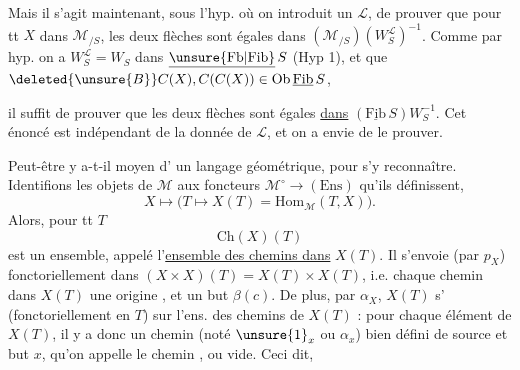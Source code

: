 Mais il s'agit maintenant, sous l'hyp. où on introduit un $\mathcal L$, de prouver que pour tt $X$ dans $\mathcal M_{/S}$, les deux flèches
sont égales dans $(\mathcal M_{/S})(W_S^{\mathcal L})^{-1}$. Comme par hyp. on a $W_S^{\mathcal L}=W_S$ dans $\underline{\unsure{\mathrm{Fb}|\mathrm{Fib}}}\,S$ (Hyp 1), et que $\deleted{\unsure{B}}C(X),C(C(X))\in\mathrm{Ob}\,\underline{\mathrm{Fib}}\,S$,

il suffit de prouver que les deux flèches sont égales \uline{dans} $(\underline{\mathrm{Fib}}\,S)W_S^{-1}$. Cet énoncé est indépendant de la donnée de $\mathcal L$, et on a envie de le prouver.

Peut-être y a-t-il moyen d' un langage géométrique, pour s'y reconnaître.  Identifions les objets  de $\mathcal M$ aux foncteurs $\mathcal M^\circ\longrightarrow(\mathrm{Ens})$ qu'ils définissent,
\[
X\longmapsto\bigl(T\longmapsto X(T)=\mathrm{Hom}_{\mathcal M}(T,X)\bigr)\text{.}
\]
Alors, pour tt $T$
\[
\mathrm{Ch}(X)(T)
\]
est un ensemble, appelé l'\uline{ensemble des chemins dans} $X(T)$. Il s'envoie (par $p_X$) fonctoriellement  dans $(X\times X)(T)=X(T)\times X(T)$, i.e. chaque chemin  dans $X(T)$  une origine , et un but $\beta(c)$. De plus, par $\alpha_X$, $X(T)$ s' (fonctoriellement en $T$) sur l'ens. des chemins de $X(T)$ : pour chaque élément  de $X(T)$, il y a donc un chemin (noté $\unsure{1}_x$ ou $\alpha_x$)  bien défini de source et but $x$, qu'on appelle le chemin , ou vide. Ceci dit,

